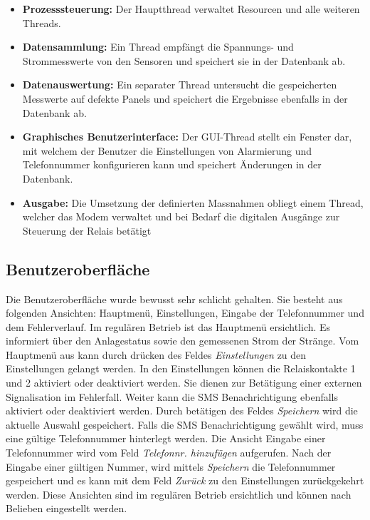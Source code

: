 \begin{itemize}
    \tightlist
    \item
        \textbf{Prozesssteuerung:} Der  Hauptthread  verwaltet  Resourcen  und
        alle weiteren Threads.
    \item
        \textbf{Datensammlung:} Ein  Thread  empf\"angt   die  Spannungs-  und
        Strommesswerte von den Sensoren und speichert sie in der Datenbank ab.
    \item
        \textbf{Datenauswertung:} Ein   separater    Thread   untersucht   die
        gespeicherten  Messwerte   auf  defekte   Panels  und   speichert  die
        Ergebnisse ebenfalls in der Datenbank ab.
    \item
        \textbf{Graphisches  Benutzerinterface:} Der   GUI-Thread  stellt  ein
        Fenster  dar,   mit  welchem   der  Benutzer  die   Einstellungen  von
        Alarmierung  und   Telefonnummer  konfigurieren  kann   und  speichert
        \"Anderungen in der Datenbank.
    \item
        \textbf{Ausgabe:} Die  Umsetzung  der definierten  Massnahmen  obliegt
        einem Thread, welcher das Modem verwaltet und bei Bedarf die digitalen
        Ausg\"ange zur Steuerung der Relais bet\"atigt
\end{itemize}


\subsection{Benutzeroberfl\"ache}
\label{subsec:software:master:GUI}

Die Benutzeroberfl\"ache wurde bewusst sehr schlicht gehalten. Sie besteht aus
folgenden  Ansichten: Hauptmen\"u,  Einstellungen, Eingabe  der  Telefonnummer
und   dem   Fehlerverlauf. Im   regul\"aren  Betrieb   ist   das   Hauptmen\"u
ersichtlich. Es  informiert  \"uber  den  Anlagestatus  sowie  den  gemessenen
Strom  der Str\"ange. Vom  Hauptmen\"u  aus kann  durch  dr\"ucken des  Feldes
\emph{Einstellungen} zu den Einstellungen gelangt werden. In den Einstellungen
k\"onnen die  Relaiskontakte 1  und 2  aktiviert oder  deaktiviert werden. Sie
dienen  zur Bet\"atigung  einer externen  Signalisation im  Fehlerfall. Weiter
kann   die  SMS   Benachrichtigung   ebenfalls   aktiviert  oder   deaktiviert
werden. Durch  bet\"atigen  des  Feldes  \emph{Speichern}  wird  die  aktuelle
Auswahl  gespeichert. Falls  die  SMS Benachrichtigung  gew\"ahlt  wird,  muss
eine  g\"ultige Telefonnummer  hinterlegt werden.   Die Ansicht  Eingabe einer
Telefonnummer  wird vom  Feld \emph{Telefonnr.  hinzuf\"ugen} aufgerufen. Nach
der  Eingabe  einer  g\"ultigen  Nummer,  wird  mittels  \emph{Speichern}  die
Telefonnummer  gespeichert und  es kann  mit dem  Feld \emph{Zur\"uck}  zu den
Einstellungen  zur\"uckgekehrt  werden. Diese  Ansichten sind  im  regul\"aren
Betrieb ersichtlich und k\"onnen nach Belieben eingestellt werden.

